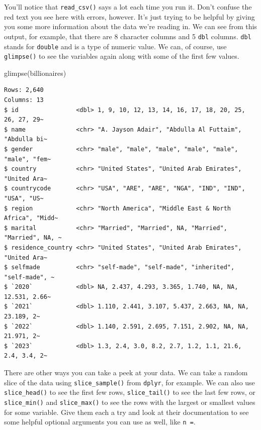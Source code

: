 \documentclass[
  letterpaper,
]{book}
\newenvironment{Shaded}{\begin{snugshade}}{\end{snugshade}}
\newcommand{\FunctionTok}[1]{\textcolor[rgb]{0.28,0.35,0.67}{#1}}
\newcommand{\NormalTok}[1]{\textcolor[rgb]{0.00,0.23,0.31}{#1}}
\begin{document}
You'll notice that \texttt{read\_csv()} says a lot each time you run it.
Don't confuse the red text you see here with errors, however. It's just
trying to be helpful by giving you some more information about the data
we're reading in. We can see from this output, for example, that there
are 8 character columns and 5 \texttt{dbl} columns. \texttt{dbl} stands
for \texttt{double} and is a type of numeric value. We can, of course,
use \texttt{glimpse()} to see the variables again along with some of the
first few values.

\begin{Shaded}
\begin{Highlighting}[]
\FunctionTok{glimpse}\NormalTok{(billionaires)}
\end{Highlighting}
\end{Shaded}

\begin{verbatim}
Rows: 2,640
Columns: 13
$ id                <dbl> 1, 9, 10, 12, 13, 14, 16, 17, 18, 20, 25, 26, 27, 29~
$ name              <chr> "A. Jayson Adair", "Abdulla Al Futtaim", "Abdulla bi~
$ gender            <chr> "male", "male", "male", "male", "male", "male", "fem~
$ country           <chr> "United States", "United Arab Emirates", "United Ara~
$ countrycode       <chr> "USA", "ARE", "ARE", "NGA", "IND", "IND", "USA", "US~
$ region            <chr> "North America", "Middle East & North Africa", "Midd~
$ marital           <chr> "Married", "Married", NA, "Married", "Married", NA, ~
$ residence_country <chr> "United States", "United Arab Emirates", "United Ara~
$ selfmade          <chr> "self-made", "self-made", "inherited", "self-made", ~
$ `2020`            <dbl> NA, 2.437, 4.293, 3.365, 1.740, NA, NA, 12.531, 2.66~
$ `2021`            <dbl> 1.110, 2.441, 3.107, 5.437, 2.663, NA, NA, 23.189, 2~
$ `2022`            <dbl> 1.140, 2.591, 2.695, 7.151, 2.902, NA, NA, 21.971, 2~
$ `2023`            <dbl> 1.3, 2.4, 3.0, 8.2, 2.7, 1.2, 1.1, 21.6, 2.4, 3.4, 2~
\end{verbatim}

There are other ways you can take a peek at your data. We can take a
random slice of the data using \texttt{slice\_sample()} from
\texttt{dplyr}, for example. We can also use \texttt{slice\_head()} to
see the first few rows, \texttt{slice\_tail()} to see the last few rows,
or \texttt{slice\_min()} and \texttt{slice\_max()} to see the rows with
the largest or smallest values for some variable. Give them each a try
and look at their documentation to see some helpful optional arguments
you can use as well, like \texttt{n\ =}.
\end{document}
